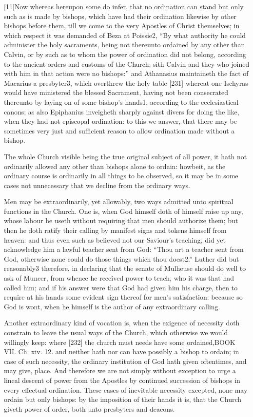 [11]Now whereas hereupon some do infer, that no ordination can stand but only such as is made by bishops, which have had their ordination likewise by other bishops before them, till we come to the very Apostles of Christ themselves; in which respect it was demanded of Beza at Poissie2, “By what authority he could administer the holy sacraments, being not thereunto ordained by any other than Calvin, or by such as to whom the power of ordination did not belong, according to the ancient orders and customs of the Church; sith Calvin and they who joined with him in that action were no bishops:” and Athanasius maintaineth the fact of Macarius a presbyter3, which overthrew the holy table [231] whereat one Ischyras would have ministered the blessed Sacrament, having not been consecrated thereunto by laying on of some bishop’s hands1, according to the ecclesiastical canons; as also Epiphanius inveigheth sharply against divers for doing the like, when they had not episcopal ordination: to this we answer, that there may be sometimes very just and sufficient reason to allow ordination made without a bishop.

The whole Church visible being the true original subject of all power, it hath not ordinarily allowed any other than bishops alone to ordain: howbeit, as the ordinary course is ordinarily in all things to be observed, so it may be in some cases not unnecessary that we decline from the ordinary ways.

Men may be extraordinarily, yet allowably, two ways admitted unto spiritual functions in the Church. One is, when God himself doth of himself raise up any, whose labour he useth without requiring that men should authorize them; but then he doth ratify their calling by manifest signs and tokens himself from heaven: and thus even such as believed not our Saviour’s teaching, did yet acknowledge him a lawful teacher sent from God: “Thou art a teacher sent from God, otherwise none could do those things which thou doest2.” Luther did but reasonably3 therefore, in declaring that the senate of Mulheuse should do well to ask of Muncer, from whence he received power to teach, who it was that had called him; and if his answer were that God had given him his charge, then to require at his hands some evident sign thereof for men’s satisfaction: because so God is wont, when he himself is the author of any extraordinary calling.

Another extraordinary kind of vocation is, when the exigence of necessity doth constrain to leave the usual ways of the Church, which otherwise we would willingly keep: where [232] the church must needs have some ordained,BOOK VII. Ch. xiv. 12. and neither hath nor can have possibly a bishop to ordain; in case of such necessity, the ordinary institution of God hath given oftentimes, and may give, place. And therefore we are not simply without exception to urge a lineal descent of power from the Apostles by continued succession of bishops in every effectual ordination. These cases of inevitable necessity excepted, none may ordain but only bishops: by the imposition of their hands it is, that the Church giveth power of order, both unto presbyters and deacons.


